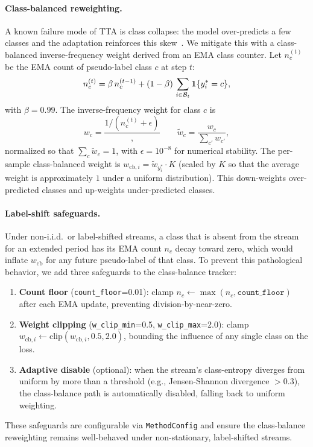 \paragraph{Class-balanced reweighting.}
A known failure mode of TTA is class collapse: the model over-predicts a few classes and the adaptation reinforces this skew~\citep{niu2022eata,prabhu2023lada}. We mitigate this with a class-balanced inverse-frequency weight derived from an EMA class counter. Let $n_c^{(t)}$ be the EMA count of pseudo-label class $c$ at step $t$:
\[
  n_c^{(t)} = \beta\, n_c^{(t-1)} + (1-\beta)\, \sum_{i \in \mathcal{B}_t} \mathbf{1}\{y_i^* = c\},
\]
with $\beta = 0.99$. The inverse-frequency weight for class $c$ is
\[
  w_c = \frac{1 / (n_c^{(t)} + \epsilon)}, \qquad \tilde{w}_c = \frac{w_c}{\sum_{c'} w_{c'}},
\]
normalized so that $\sum_c \tilde{w}_c = 1$, with $\epsilon = 10^{-8}$ for numerical stability. The per-sample class-balanced weight is $w_{\mathrm{cb},i} = \tilde{w}_{y_i^*} \cdot K$ (scaled by $K$ so that the average weight is approximately $1$ under a uniform distribution). This down-weights over-predicted classes and up-weights under-predicted classes.

\paragraph{Label-shift safeguards.}
Under non-i.i.d.\ or label-shifted streams, a class that is absent from the stream for an extended period has its EMA count $n_c$ decay toward zero, which would inflate $w_{\mathrm{cb}}$ for any future pseudo-label of that class. To prevent this pathological behavior, we add three safeguards to the class-balance tracker:
\begin{enumerate}[leftmargin=*,topsep=2pt,itemsep=2pt]
  \item \textbf{Count floor} (\texttt{count\_floor}=0.01): clamp $n_c \gets \max(n_c, \texttt{count\_floor})$ after each EMA update, preventing division-by-near-zero.
  \item \textbf{Weight clipping} (\texttt{w\_clip\_min}=0.5, \texttt{w\_clip\_max}=2.0): clamp $w_{\mathrm{cb},i} \gets \mathrm{clip}(w_{\mathrm{cb},i}, 0.5, 2.0)$, bounding the influence of any single class on the loss.
  \item \textbf{Adaptive disable} (optional): when the stream's class-entropy diverges from uniform by more than a threshold (e.g., Jensen-Shannon divergence $> 0.3$), the class-balance path is automatically disabled, falling back to uniform weighting.
\end{enumerate}
These safeguards are configurable via \texttt{MethodConfig} and ensure the class-balance reweighting remains well-behaved under non-stationary, label-shifted streams.

